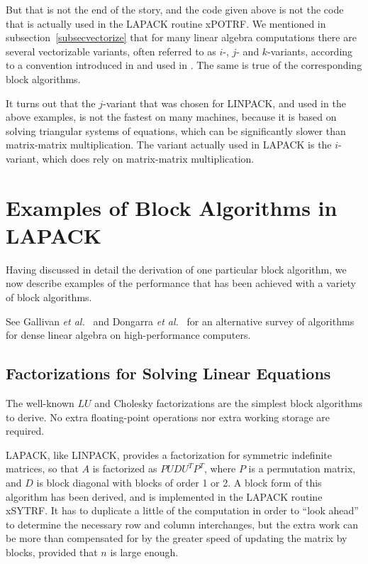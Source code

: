 But that is not the end of the story, and the code given above is
not the code that is actually used in the LAPACK routine
xPOTRF.
We mentioned in subsection~\ref{subsecvectorize} that for many
linear algebra computations there
are several vectorizable variants, often referred to as $i$-, $j$- and
$k$-variants, according to a convention introduced in \cite{Dongarra84a}
and used
in \cite{GVL2}. The same is true of the corresponding block algorithms.

It turns out that the $j$-variant
that was chosen for LINPACK, and used in the above
examples, is not the fastest on many machines, because it is based on
solving triangular
systems of equations, which can be significantly slower than matrix-matrix
multiplication.
The variant actually used in LAPACK is the $i$-variant, which does
rely on matrix-matrix multiplication.

\section{Examples of Block Algorithms in LAPACK}\label{secblock}

Having discussed in detail the derivation of one particular block algorithm,
we now describe examples of the performance that has been achieved with
a variety of block algorithms.

See Gallivan {\it et al.}~\cite{gallivanetal} and Dongarra {\it et
al.}~\cite{dongarraetal2}
for an alternative survey of
algorithms for dense linear algebra
on high-performance computers.

\subsection{Factorizations for Solving Linear Equations}
\label{subsecblocklineq}

The well-known $LU$ and Cholesky factorizations are the simplest block
algorithms to derive. No extra floating-point operations nor extra
working storage are required.

LAPACK, like LINPACK, provides a factorization for symmetric
indefinite
matrices,  so that $A$ is factorized as $P U D U^T P^T$, where $P$ is a
permutation matrix, and $D$ is block diagonal with blocks of order 1
or 2. A block form of this algorithm has been derived,
and is implemented in the LAPACK routine
xSYTRF.
It has to duplicate a little of the computation in order
to ``look ahead''
to determine the necessary row and column interchanges, but the extra work
can be more than compensated for by the greater speed of updating the matrix
by blocks,
provided that $n$ is large enough.

